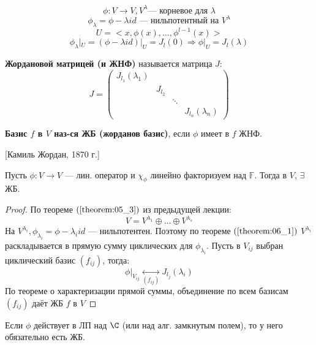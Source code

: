 \[
    \phi \colon V \rightarrow V, V^{\lambda} \text{--- корневое для $\lambda$}
\]
\[
    \phi_{\lambda} = \phi - \lambda id \text{ --- нильпотентный на $V^{\lambda}$}
\]
\[
    U = <x, \phi(x), \ldots, \phi^{l - 1}(x)>
\]
\[
    \phi_{\lambda}|_{U} = (\phi - \lambda id)|_{U} = J_{l}(0) \Rightarrow \phi|_{U} = J_l(\lambda)
\]
\begin{definition}
    \textbf{Жордановой матрицей (и ЖНФ)} называется матрица $J$:
    \[
        J = \begin{pmatrix} J_{l_1}(\lambda_1) \\ & J_{l_2} \\ & & \ddots \\ & & & J_{l_n}(\lambda_n)\end{pmatrix}
    \]
\end{definition}
\begin{definition}
    \textbf{Базис $f$ в $V$ наз-ся ЖБ (жорданов базис)}, если $\phi$ имеет в $f$ ЖНФ.
\end{definition}[Камиль Жордан, 1870 г.]
\begin{theorem}
\label{theorem:06_2}
    Пусть $\phi \colon V \rightarrow V$ --- лин. оператор и $\chi_\phi$ линейно факторизуем над $\mathbb{F}$. Тогда в $V$, $\exists$ ЖБ.
\end{theorem}
\begin{proof}
    По теореме $(\ref{theorem:05_3})$ из предыдущей лекции:
    \[
        V = V^{\lambda_1} \oplus \ldots \oplus V^{\lambda_s}
    \]
    На $V^{\lambda_i}, \phi_{\lambda_i} = \phi - \lambda_i id$ --- нильпотентен. Поэтому по теореме $(\ref{theorem:06_1})$ $V^{\lambda_i}$ раскладывается в прямую сумму циклических для $\phi_{\lambda_i}$. Пусть в $V_{ij}$ выбран циклический базис $(f_{ij})$, тогда:
    \[
    \phi|_{V_{ij}} \underset{(f_{ij})}{\longleftrightarrow} J_{l_j}(\lambda_i)
    \]
    По теореме о характеризации прямой суммы, объединение по всем базисам $(f_{ij})$ даёт ЖБ $f$ в $V$
\end{proof}
\begin{consequence}
    Если $\phi$ действует в ЛП над $\C$ (или над алг. замкнутым полем), то у него обязательно есть ЖБ.
\end{consequence}

